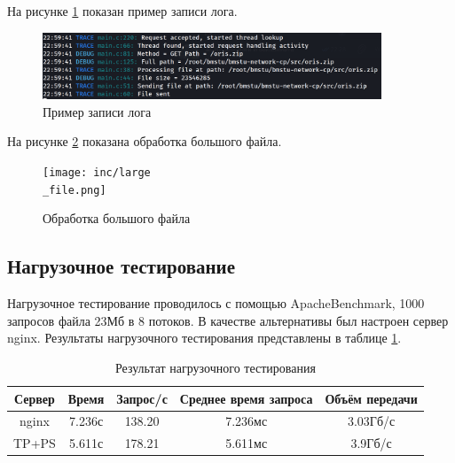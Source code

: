 На рисунке \ref{fig:log} показан пример записи лога.

\begin{figure}[H]
	\centering
	\includegraphics[width=0.9\textwidth]{inc/log.png}
	\caption{Пример записи лога}
	\label{fig:log}
\end{figure}

На рисунке \ref{fig:large_file} показана обработка большого файла.

\begin{figure}[H]
	\centering
	\texttt{[image: inc/large\\\_file.png]}
	\caption{Обработка большого файла}
	\label{fig:large_file}
\end{figure}

\subsection{Нагрузочное тестирование}

Нагрузочное тестирование проводилось с помощью ApacheBenchmark, 1000 запросов файла 23Мб в 8 потоков. В качестве альтернативы был настроен сервер nginx. Результаты нагрузочного тестирования представлены в таблице \ref{tab:bench}.

\begin{table}[h]
	\begin{center}
		\caption{Результат нагрузочного тестирования}
		\label{tab:bench}
		\begin{tabular}{|c|c|c|c|c|}
			\hline
			Сервер & Время & Запрос/с & Среднее время запроса & Объём передачи\\
			\hline
			nginx & 7.236с & 138.20 & 7.236мс & 3.03Гб/с \\ \hline
			TP+PS & 5.611с & 178.21 & 5.611мс & 3.9Гб/с \\ \hline
		\end{tabular}
	\end{center}
\end{table}


\clearpage
